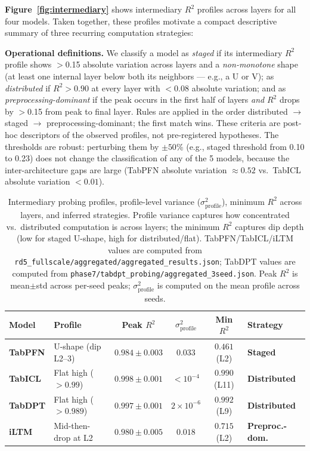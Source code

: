\documentclass{article}
\begin{document}
\textbf{Figure~\ref{fig:intermediary}} shows intermediary $R^2$ profiles across layers for all four models. Taken together, these profiles motivate a compact descriptive summary of three recurring computation strategies:

\textbf{Operational definitions.} We classify a model as \textit{staged} if its intermediary $R^2$ profile shows $>$0.15 absolute variation across layers and a \emph{non-monotone} shape (at least one internal layer below both its neighbors --- e.g., a U or V); as \textit{distributed} if $R^2 > 0.90$ at every layer with $<$0.08 absolute variation; and as \textit{preprocessing-dominant} if the peak occurs in the first half of layers \emph{and} $R^2$ drops by $>$0.15 from peak to final layer. Rules are applied in the order distributed $\to$ staged $\to$ preprocessing-dominant; the first match wins. These criteria are post-hoc descriptors of the observed profiles, not pre-registered hypotheses. The thresholds are robust: perturbing them by $\pm 50$\% (e.g., staged threshold from 0.10 to 0.23) does not change the classification of any of the 5 models, because the inter-architecture gaps are large (TabPFN absolute variation $\approx 0.52$ vs.\ TabICL absolute variation $< 0.01$).

\begin{table}[t]
\centering
\caption{Intermediary probing profiles, profile-level variance ($\sigma^2_\text{profile}$), minimum $R^2$ across layers, and inferred strategies. Profile variance captures how concentrated vs.\ distributed computation is across layers; the minimum $R^2$ captures dip depth (low for staged U-shape, high for distributed/flat). TabPFN/TabICL/iLTM values are computed from \texttt{rd5\_fullscale/aggregated/aggregated\_results.json}; TabDPT values are computed from \texttt{phase7/tabdpt\_probing/aggregated\_3seed.json}. Peak $R^2$ is mean$\pm$std across per-seed peaks; $\sigma^2_\text{profile}$ is computed on the mean profile across seeds.}
\label{tab:three-strategies}
\small
\begin{tabular}{@{}l l c c c l@{}}
\toprule
Model & Profile & Peak $R^2$ & $\sigma^2_\text{profile}$ & Min $R^2$ & Strategy \\
\midrule
\textbf{TabPFN} & U-shape (dip L2--3) & $0.984 \pm 0.003$ & $0.033$ & $0.461$ (L2) & \textbf{Staged} \\
\textbf{TabICL} & Flat high ($> 0.99$) & $0.998 \pm 0.001$ & $<10^{-4}$ & $0.990$ (L11) & \textbf{Distributed} \\
\textbf{TabDPT} & Flat high ($> 0.989$) & $0.997 \pm 0.001$ & $2{\times}10^{-6}$ & $0.992$ (L9) & \textbf{Distributed} \\
\textbf{iLTM} & Mid-then-drop at L2 & $0.980 \pm 0.005$ & $0.018$ & $0.715$ (L2) & \textbf{Preproc.-dom.} \\
\bottomrule
\end{tabular}
\end{table}
\end{document}
